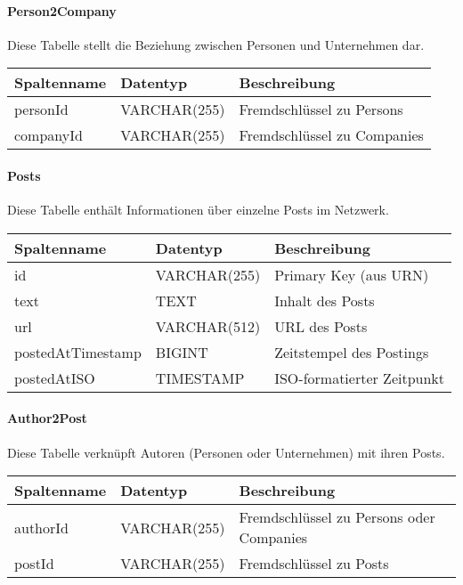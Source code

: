 \documentclass[a4paper,11pt]{article}
\begin{document}
\paragraph{Person2Company}
Diese Tabelle stellt die Beziehung zwischen Personen und Unternehmen dar.

\begin{table}[h]
\begin{tabular}{|l|l|l|}
\hline
\textbf{Spaltenname} & \textbf{Datentyp} & \textbf{Beschreibung} \\
\hline
personId & VARCHAR(255) & Fremdschlüssel zu Persons \\
companyId & VARCHAR(255) & Fremdschlüssel zu Companies \\
\hline
\end{tabular}
\end{table}

\paragraph{Posts}
Diese Tabelle enthält Informationen über einzelne Posts im Netzwerk.

\begin{table}[h]
\begin{tabular}{|l|l|l|}
\hline
\textbf{Spaltenname} & \textbf{Datentyp} & \textbf{Beschreibung} \\
\hline
id & VARCHAR(255) & Primary Key (aus URN) \\
text & TEXT & Inhalt des Posts \\
url & VARCHAR(512) & URL des Posts \\
postedAtTimestamp & BIGINT & Zeitstempel des Postings \\
postedAtISO & TIMESTAMP & ISO-formatierter Zeitpunkt \\
\hline
\end{tabular}
\end{table}

\paragraph{Author2Post}
Diese Tabelle verknüpft Autoren (Personen oder Unternehmen) mit ihren Posts.

\begin{table}[h]
\begin{tabular}{|l|l|l|}
\hline
\textbf{Spaltenname} & \textbf{Datentyp} & \textbf{Beschreibung} \\
\hline
authorId & VARCHAR(255) & Fremdschlüssel zu Persons oder Companies \\
postId & VARCHAR(255) & Fremdschlüssel zu Posts \\
\hline
\end{tabular}
\end{table}
\end{document}
